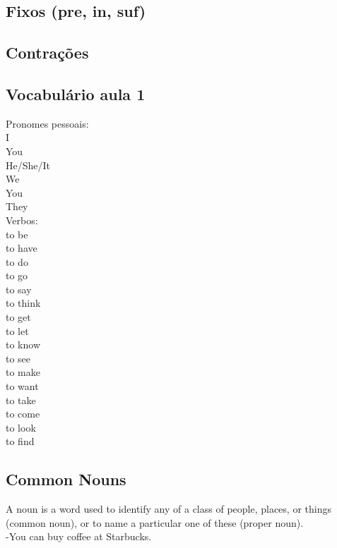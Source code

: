 \documentclass[12pt,a4paper]{article} %
\begin{document}
\subsection{Fixos (pre, in, suf)}

\subsection{Contrações}

\subsection{Vocabulário aula 1}

	Pronomes pessoais:\\
		
		I\\
		You\\
		He/She/It\\
		We\\
		You\\
		They\\

	Verbos:\\
	
		to be\\
		to have\\
		to do\\
		to go\\
		to say\\
		to think\\
		to get\\
		to let\\
		to know\\
		to see\\
		to make\\
		to want\\
		to take\\
		to come\\
		to look\\
		to find\\

\subsection{Common Nouns}

	A noun is a word used to identify any of a class of people, places, or things (common noun),
	or to name a particular one of these (proper noun).\\

		-You can buy coffee at Starbucks.\\
		
\end{document}
